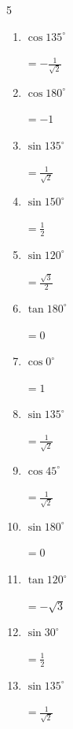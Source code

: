 \begin{multicols}{5}
\begin{enumerate}
\columnbreak %

  \item $\displaystyle \cos{135^\circ}$

        $\displaystyle =-\frac{1}{\sqrt{2}}$

  \item $\displaystyle \cos{180^\circ}$

        $\displaystyle =-1$

  \item $\displaystyle \sin{135^\circ}$

        $\displaystyle =\frac{1}{\sqrt{2}}$

  \item $\displaystyle \sin{150^\circ}$

        $\displaystyle =\frac{1}{2}$

  \item $\displaystyle \sin{120^\circ}$

        $\displaystyle =\frac{\sqrt{3}}{2}$

  \item $\displaystyle \tan{180^\circ}$

        $\displaystyle =0$

  \item $\displaystyle \cos{0^\circ}$

        $\displaystyle =1$

  \item $\displaystyle \sin{135^\circ}$

        $\displaystyle =\frac{1}{\sqrt{2}}$

  \item $\displaystyle \cos{45^\circ}$

        $\displaystyle =\frac{1}{\sqrt{2}}$

  \item $\displaystyle \sin{180^\circ}$

        $\displaystyle =0$

  \item $\displaystyle \tan{120^\circ}$

        $\displaystyle =-\sqrt{3}$

  \item $\displaystyle \sin{30^\circ}$

        $\displaystyle =\frac{1}{2}$

  \item $\displaystyle \sin{135^\circ}$

        $\displaystyle =\frac{1}{\sqrt{2}}$


\end{enumerate}
\end{multicols}
